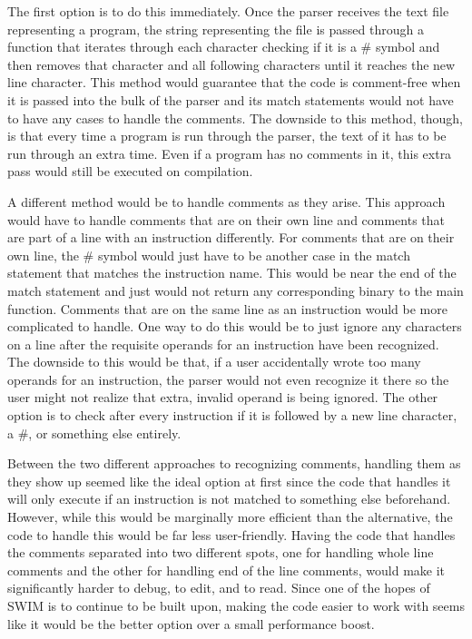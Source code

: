 \documentclass[
    paper=letter,
    parskip=half,
    fontsize=12pt,
    titlepage=firstiscover,
    toc=bibliography,
    numbers=endperiod
]{scrartcl}
\begin{document}
The first option is to do this immediately. Once the parser receives the
text file representing a program, the string representing the file is
passed through a function that iterates through each character checking
if it is a \# symbol and then removes that character and all following
characters until it reaches the new line character. This method would
guarantee that the code is comment-free when it is passed into the bulk
of the parser and its match statements would not have to have any cases
to handle the comments. The downside to this method, though, is that
every time a program is run through the parser, the text of it has to be
run through an extra time. Even if a program has no comments in it, this
extra pass would still be executed on compilation.

A different method would be to handle comments as they arise. This
approach would have to handle comments that are on their own line and
comments that are part of a line with an instruction differently. For
comments that are on their own line, the \# symbol would just have to be
another case in the match statement that matches the instruction name.
This would be near the end of the match statement and just would not
return any corresponding binary to the main function. Comments that are
on the same line as an instruction would be more complicated to handle.
One way to do this would be to just ignore any characters on a line
after the requisite operands for an instruction have been recognized.
The downside to this would be that, if a user accidentally wrote too
many operands for an instruction, the parser would not even recognize it
there so the user might not realize that extra, invalid operand is being
ignored. The other option is to check after every instruction if it is
followed by a new line character, a \#, or something else entirely.

Between the two different approaches to recognizing comments, handling
them as they show up seemed like the ideal option at first since the
code that handles it will only execute if an instruction is not matched
to something else beforehand. However, while this would be marginally
more efficient than the alternative, the code to handle this would be
far less user-friendly. Having the code that handles the comments
separated into two different spots, one for handling whole line comments
and the other for handling end of the line comments, would make it
significantly harder to debug, to edit, and to read. Since one of the
hopes of SWIM is to continue to be built upon, making the code easier to
work with seems like it would be the better option over a small
performance boost.
\end{document}
